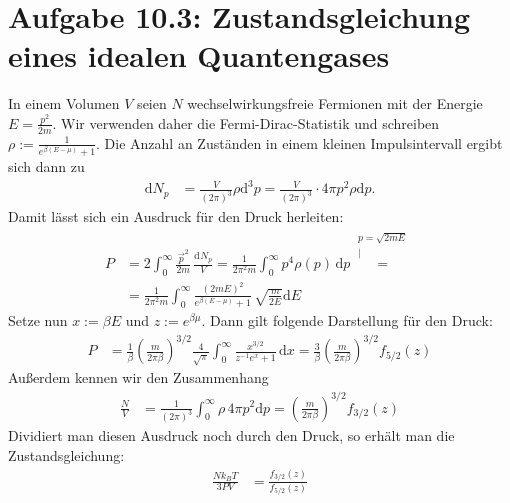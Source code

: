 \documentclass[a4paper,12pt]{article}
\newcommand{\kom}{}
\newcommand{\intx}{}
\newcommand{\intr}{}
\newcommand{\kla}{}
\newcommand{\tecxt}{}
\begin{document}
\section*{Aufgabe 10.3: Zustandsgleichung eines idealen Quantengases}
In einem Volumen $V$ seien $N$ wechselwirkungsfreie Fermionen mit der Energie $E=\frac{p^2}{2m}$. Wir verwenden daher die Fermi-Dirac-Statistik und schreiben $\rho:=\frac{1}{e^{\beta(E-\mu)}+1}$. Die Anzahl an Zuständen in einem kleinen Impulsintervall ergibt sich dann zu
\begin{align*}
\tecxt\text{d}N_p&=\frac{V}{(2\pi)^3}\rho\tecxt\text{d}^3p=\frac{V}{(2\pi)^3}\cdot 4\pi p^2\rho\tecxt\text{d}p.
\end{align*}
Damit lässt sich ein Ausdruck für den Druck herleiten:
\begin{align*}
P&=2\intr\int_{0}^{\infty}{\frac{\vec{p}^2}{2m}}\,\frac{\mathrm{d}^{ }N_p}{V}=\frac{1}{2\pi^2 m}\intx\int_{0}^{\infty}p^4\rho(p)\,\mathrm{d}p\kom\overset{\substack{{p=\sqrt{2mE}} \\ |}}{=}\\
&=\frac{1}{2\pi^2 m}\intx\int_{0}^{\infty}\frac{(2mE)^2}{e^{\beta (E-\mu)}+1}\,\sqrt{\frac{m}{2E}}\mathrm{d}E
\end{align*}
Setze nun $x:=\beta E$ und $z:=e^{\beta\mu}$. Dann gilt folgende Darstellung für den Druck:
\begin{align*}
P&=\frac{1}{\beta}\kla\left( {\frac{m}{2\pi\beta}} \right)^{3/2}\frac{4}{\sqrt{\pi}}\intx\int_{0}^{\infty}\frac{x^{3/2}}{z^{-1}e^x+1}\,\mathrm{d}x=\frac{3}{\beta}\kla\left( {\frac{m}{2\pi\beta}} \right)^{3/2}f_{5/2}(z)
\end{align*}
Außerdem kennen wir den Zusammenhang
\begin{align*}
\frac{N}{V}&=\frac{1}{(2\pi)^3}\intx\int_{0}^{\infty}\rho\,4\pi p^2\mathrm{d}p=\kla\left( {\frac{m}{2\pi\beta}} \right)^{3/2}f_{3/2}(z)
\end{align*}
Dividiert man diesen Ausdruck noch durch den Druck, so erhält man die Zustandsgleichung:
\begin{align*}
\frac{Nk_BT}{3PV}&=\frac{f_{3/2}(z)}{f_{5/2}(z)}
\end{align*}
\end{document}
